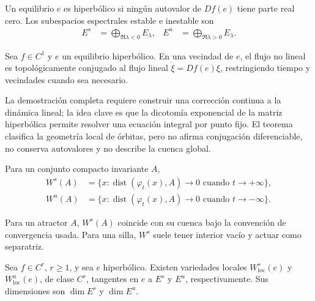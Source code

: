 \begin{definition}
Un equilibrio \(e\) es hiperbólico si ningún autovalor de \(Df(e)\) tiene
parte real cero. Los subespacios espectrales estable e inestable son
\begin{align}
 E^s&=\bigoplus_{\Re\lambda<0}E_\lambda,
 &E^u&=\bigoplus_{\Re\lambda>0}E_\lambda.
 \label{geo:eq:spectral-splitting}
\end{align}
\end{definition}

\begin{proposition}
Sea \(f\in C^1\) y \(e\) un equilibrio hiperbólico. En una vecindad de \(e\),
el flujo no lineal es topológicamente conjugado al flujo lineal
\(\dot\xi=Df(e)\xi\), restringiendo tiempo y vecindades cuando sea necesario.
\end{proposition}

La demostración completa requiere construir una corrección continua a la
dinámica lineal; la idea clave es que la dicotomía exponencial de la matriz
hiperbólica permite resolver una ecuación integral por punto fijo. El teorema
clasifica la geometría local de órbitas, pero no afirma conjugación
diferenciable, no conserva autovalores y no describe la cuenca global.

\begin{definition}
Para un conjunto compacto invariante \(A\),
\begin{align}
 W^s(A)&=\{x:\operatorname{dist}(\varphi_t(x),A)\to0
                    \text{ cuando }t\to+\infty\},\nonumber\\
 W^u(A)&=\{x:\operatorname{dist}(\varphi_t(x),A)\to0
                    \text{ cuando }t\to-\infty\}.
 \label{geo:eq:stable-unstable-sets}
\end{align}
\end{definition}

Para un atractor \(A\), \(W^s(A)\) coincide con su cuenca bajo la convención
de convergencia usada. Para una silla, \(W^s\) suele tener interior vacío y
actuar como separatriz.

\begin{proposition}
Sea \(f\in C^r\), \(r\ge1\), y sea \(e\) hiperbólico. Existen variedades
locales \(W^s_{\mathrm{loc}}(e)\) y \(W^u_{\mathrm{loc}}(e)\), de clase
\(C^r\), tangentes en \(e\) a \(E^s\) y \(E^u\), respectivamente. Sus
dimensiones son \(\dim E^s\) y \(\dim E^u\).
\end{proposition}

